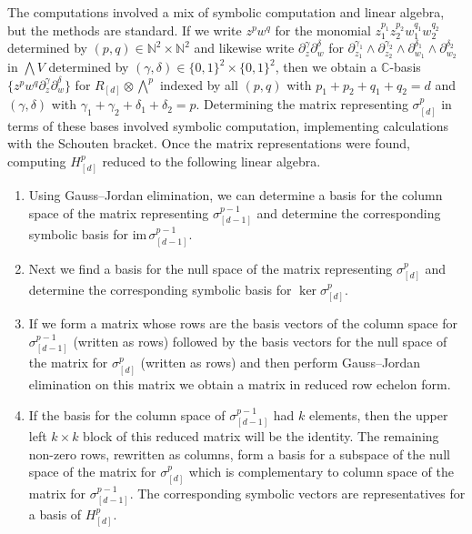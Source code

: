 \documentclass[10pt,a4paper]{amsart}
\numberwithin{equation}{section}
\begin{document}
The computations involved a mix of symbolic computation and linear algebra, but the methods are standard. If we write $z^pw^q$ for the monomial $z_1^{p_1}z_2^{p_2}w_1^{q_1}w_2^{q_2}$ determined by $(p,q)\in \mathbb N^2\times \mathbb N^2$ and likewise write $\partial_{z}^\gamma\partial_{w}^\delta$ for $\partial_{z_1}^{\gamma_1}\wedge\partial_{z_2}^{\gamma_2}\wedge\partial_{w_1}^{\delta_1}\wedge\partial_{w_2}^{\delta_2}$ in $\bigwedge V$ determined by $(\gamma,\delta)\in \{0,1\}^2\times\{0,1\}^2$, then we obtain a ${\mathbb C}$-basis $\{z^p w^q \partial_{z}^\gamma \partial_{w}^\delta\}$ for $R_{[d]}\otimes \bigwedge^p$ indexed by all $(p,q)$ with $p_1+p_2+q_1+q_2=d$ and $(\gamma,\delta)$ with $\gamma_1+\gamma_2+\delta_1+\delta_2=p$. Determining the matrix representing $\sigma^p_{[d]}$ in terms of these bases involved symbolic computation, implementing calculations with the Schouten bracket. Once the matrix representations were found, computing $H^p_{[d]}$ reduced to the following linear algebra.
\begin{enumerate}\itemsep=0pt
\item Using Gauss--Jordan elimination, we can determine a basis for the column space of the matrix representing $\sigma^{p-1}_{[d-1]}$ and determine the corresponding symbolic basis for $\mathrm{im}\,\sigma^{p-1}_{[d-1]}$.
\item Next we f\/ind a basis for the null space of the matrix representing $\sigma^p_{[d]}$ and determine the corresponding symbolic basis for $\ker\sigma_{[d]}^p$.
\item If we form a matrix whose rows are the basis vectors of the column space for $\sigma_{[d-1]}^{p-1}$ (written as rows) followed by the basis vectors for the null space of the matrix for $\sigma^p_{[d]}$ (written as rows) and then perform Gauss--Jordan elimination on this matrix we obtain a matrix in reduced row echelon form.
\item If the basis for the column space of $\sigma_{[d-1]}^{p-1}$ had $k$ elements, then the upper left $k\times k$ block of this reduced matrix will be the identity. The remaining non-zero rows, rewritten as columns, form a basis for a subspace of the null space of the matrix for $\sigma^p_{[d]}$ which is complementary to column space of the matrix for $\sigma^{p-1}_{[d-1]}$. The corresponding symbolic vectors are representatives for a basis of $H^p_{[d]}$.
\end{enumerate}
\end{document}
